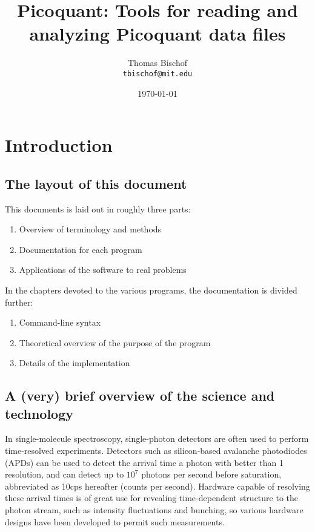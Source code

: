 \documentclass{book}
\title{Picoquant: Tools for reading and analyzing Picoquant data files}
\author{Thomas Bischof \\ \texttt{tbischof@mit.edu}}
\date{\today}
\newcommand{\cps}{cps}
\begin{document}
\maketitle
\tableofcontents
 
\chapter{Introduction}
\section{The layout of this document}
This documents is laid out in roughly three parts:
\begin{enumerate}
\item Overview of terminology and methods
\item Documentation for each program
\item Applications of the software to real problems
\end{enumerate}
In the chapters devoted to the various programs, the documentation is divided further:
\begin{enumerate}
\item Command-line syntax
\item Theoretical overview of the purpose of the program
\item Details of the implementation
\end{enumerate}

\section{A (very) brief overview of the science and technology}
In single-molecule spectroscopy, single-photon detectors are often used to perform time-resolved experiments. Detectors such as silicon-based avalanche photodiodes (APDs) can be used to detect the arrival time a photon with better than 1\nano\second{} resolution, and can detect up to $10^{7}$ photons per second before saturation, abbreviated as 10\mega\cps{} hereafter (counts per second). Hardware capable of resolving these arrival times is of great use for revealing time-dependent structure to the photon stream, such as intensity fluctuations and bunching, so various hardware designs have been developed to permit such measurements.
\end{document}
